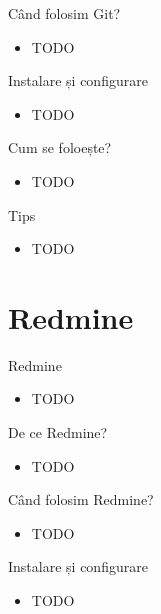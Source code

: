 \documentclass{beamer}
\begin{document}
\begin{frame}{Când folosim Git?}
  \begin{itemize}
    \item TODO
  \end{itemize}
\end{frame}

\begin{frame}{Instalare și configurare}
  \begin{itemize}
    \item TODO
  \end{itemize}
\end{frame}

\begin{frame}{Cum se foloește?}
  \begin{itemize}
    \item TODO
  \end{itemize}
\end{frame}

\begin{frame}{Tips}
  \begin{itemize}
    \item TODO
  \end{itemize}
\end{frame}

\section{Redmine}

\begin{frame}{Redmine}
  \begin{itemize}
    \item TODO
  \end{itemize}
\end{frame}

\begin{frame}{De ce Redmine?}
  \begin{itemize}
    \item TODO
  \end{itemize}
\end{frame}

\begin{frame}{Când folosim Redmine?}
  \begin{itemize}
    \item TODO
  \end{itemize}
\end{frame}

\begin{frame}{Instalare și configurare}
  \begin{itemize}
    \item TODO
  \end{itemize}
\end{frame}
\end{document}
